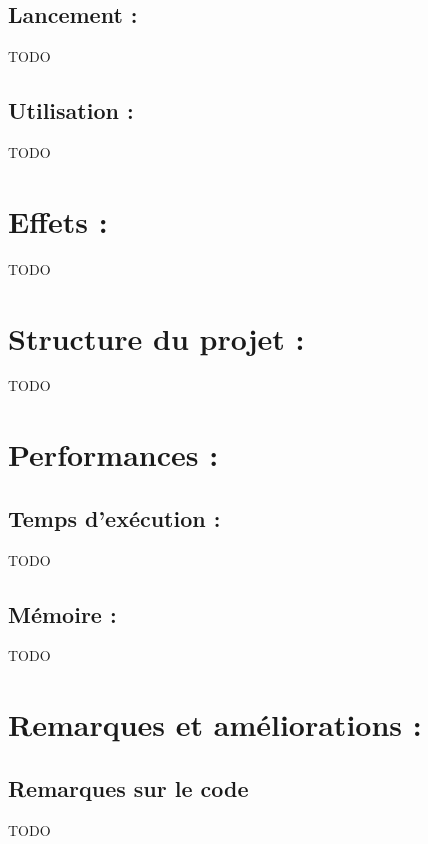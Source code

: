 \documentclass[12pt, a4paper]{article}
\begin{document}
\subsection{Lancement :}
TODO


\subsection{Utilisation :}
TODO



\section{Effets :}
TODO




\section{Structure du projet :}
TODO


\section{Performances :}

\subsection{Temps d'exécution :}
TODO






\subsection{Mémoire :}
TODO


\section{Remarques et améliorations  :}

\subsection{Remarques sur le code}
TODO
\end{document}
